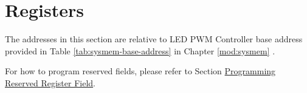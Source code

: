 \documentclass[main\_\_EN.tex]{subfiles}
\begin{document}
\newpage
\section{Registers}
\label{sec:ledc-reg-field}

The addresses in this section are relative to LED PWM Controller base address provided in Table \ref{tab:sysmem-base-address} in Chapter \ref{mod:sysmem} \textit{}.

For how to program reserved fields, please refer to Section \hyperref[programming-reserved-field]{Programming Reserved Register Field}.


\end{document}
